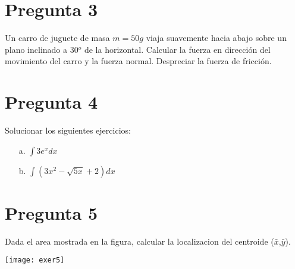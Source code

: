 \documentclass[11pt, oneside]{article}   	%
\begin{document}
\section*{Pregunta 3}\vspace{-0.3cm}
Un carro de juguete de masa $m=50g$ viaja suavemente hacia abajo sobre un plano inclinado a 30$^o$ de la horizontal. Calcular la fuerza en direcci\'on del movimiento del carro y la fuerza normal. Despreciar la fuerza de fricci\'on.
	
\section*{Pregunta 4}\vspace{-0.3cm}
Solucionar los siguientes ejercicios:
\begin{itemize}
\item[a.] $\int 3e^x dx$ 
\item[b.] $\int (3x^2 - \sqrt{5x} +2) dx$
\end{itemize}
	
\section*{Pregunta 5}\vspace{-0.3cm}
Dada el area mostrada en la figura, calcular la localizacion del centroide ($\bar{x}$,$\bar{y}$).
\vspace{-0.2cm}
\begin{center}
\texttt{[image: exer5]}
\end{center}

	
\end{document}

